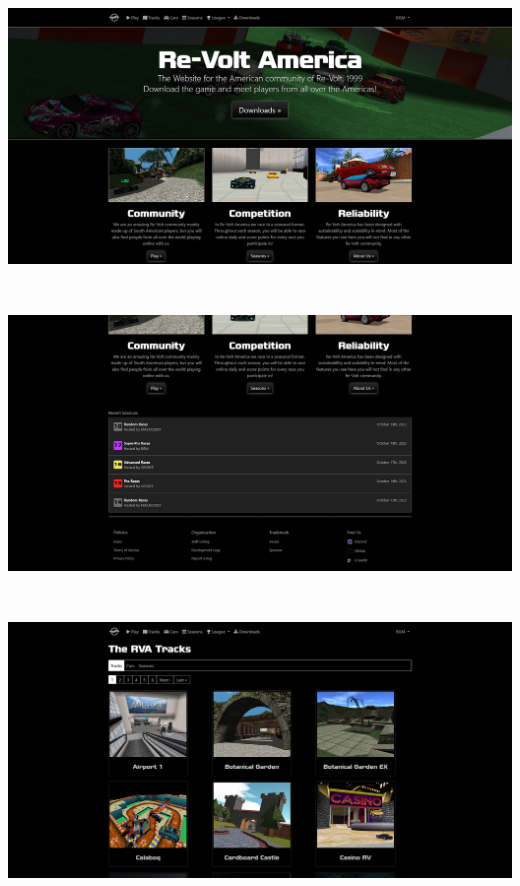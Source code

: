 \includegraphics[width=15cm, height=8cm]{img/landing.png} \\

\includegraphics[width=15cm, height=8cm]{img/landing2.png} \\

\includegraphics[width=15cm, height=8cm]{img/tracks.png} \\

